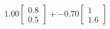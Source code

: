 \documentclass[preview]{standalone}
\begin{document}
\begin{align*}
1.00 \begin{bmatrix} 0.8 \\ 0.5 \end{bmatrix} + -0.70 \begin{bmatrix} 1 \\ 1.6 \end{bmatrix}
\end{align*}
\end{document}
